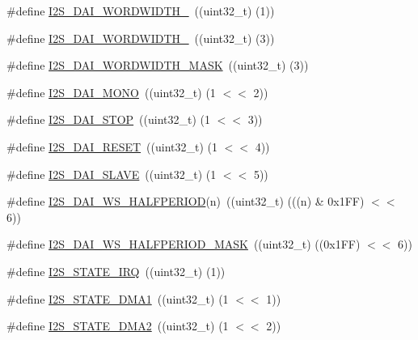 \begin{DoxyCompactItemize}
\item 
\#define \hyperlink{group___i2_s__18_x_x__43_x_x_ga26e60492415a246afde8d4ede5aa292e}{I2\+S\+\_\+\+D\+A\+I\+\_\+\+W\+O\+R\+D\+W\+I\+D\+T\+H\+\_}~((uint32\+\_\+t) (1))
\item 
\#define \hyperlink{group___i2_s__18_x_x__43_x_x_ga576561248aa7e6f27c5ef6c51def80ed}{I2\+S\+\_\+\+D\+A\+I\+\_\+\+W\+O\+R\+D\+W\+I\+D\+T\+H\+\_}~((uint32\+\_\+t) (3))
\item 
\#define \hyperlink{group___i2_s__18_x_x__43_x_x_ga1177f9594c24141162839aafe829fcb9}{I2\+S\+\_\+\+D\+A\+I\+\_\+\+W\+O\+R\+D\+W\+I\+D\+T\+H\+\_\+\+M\+A\+SK}~((uint32\+\_\+t) (3))
\item 
\#define \hyperlink{group___i2_s__18_x_x__43_x_x_ga352feb095d028efc44d17f72beacfae5}{I2\+S\+\_\+\+D\+A\+I\+\_\+\+M\+O\+NO}~((uint32\+\_\+t) (1 $<$$<$ 2))
\item 
\#define \hyperlink{group___i2_s__18_x_x__43_x_x_ga2ed2d2a9f59339ad3cf1f28a78bfcad6}{I2\+S\+\_\+\+D\+A\+I\+\_\+\+S\+T\+OP}~((uint32\+\_\+t) (1 $<$$<$ 3))
\item 
\#define \hyperlink{group___i2_s__18_x_x__43_x_x_gae57a0b564a399a726a9a6737f5733beb}{I2\+S\+\_\+\+D\+A\+I\+\_\+\+R\+E\+S\+ET}~((uint32\+\_\+t) (1 $<$$<$ 4))
\item 
\#define \hyperlink{group___i2_s__18_x_x__43_x_x_ga664f6b8ac38d7b3a23aae4e7a2fa1c6f}{I2\+S\+\_\+\+D\+A\+I\+\_\+\+S\+L\+A\+VE}~((uint32\+\_\+t) (1 $<$$<$ 5))
\item 
\#define \hyperlink{group___i2_s__18_x_x__43_x_x_gab175fcd8e7e80e59833b596a90b16f79}{I2\+S\+\_\+\+D\+A\+I\+\_\+\+W\+S\+\_\+\+H\+A\+L\+F\+P\+E\+R\+I\+OD}(n)~((uint32\+\_\+t) (((n) \& 0x1\+F\+F) $<$$<$ 6))
\item 
\#define \hyperlink{group___i2_s__18_x_x__43_x_x_gaa960b95856c5f78a0eaed42d383dd124}{I2\+S\+\_\+\+D\+A\+I\+\_\+\+W\+S\+\_\+\+H\+A\+L\+F\+P\+E\+R\+I\+O\+D\+\_\+\+M\+A\+SK}~((uint32\+\_\+t) ((0x1\+F\+F) $<$$<$ 6))
\item 
\#define \hyperlink{group___i2_s__18_x_x__43_x_x_gaa412bd295235fcd4d7f0ad284d9386de}{I2\+S\+\_\+\+S\+T\+A\+T\+E\+\_\+\+I\+RQ}~((uint32\+\_\+t) (1))
\item 
\#define \hyperlink{group___i2_s__18_x_x__43_x_x_ga0e9a701addd279db953ca34d56487dbd}{I2\+S\+\_\+\+S\+T\+A\+T\+E\+\_\+\+D\+M\+A1}~((uint32\+\_\+t) (1 $<$$<$ 1))
\item 
\#define \hyperlink{group___i2_s__18_x_x__43_x_x_ga84dfa37fbee79986ec79f4d856b8df24}{I2\+S\+\_\+\+S\+T\+A\+T\+E\+\_\+\+D\+M\+A2}~((uint32\+\_\+t) (1 $<$$<$ 2))
\item 

\end{DoxyCompactItemize}
